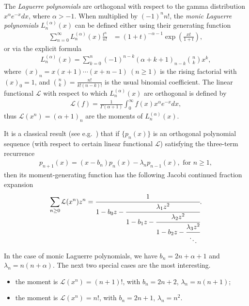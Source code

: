 \documentclass[12pt]{amsart}
\numberwithin{equation}{section}
\theoremstyle{plain}
\theoremstyle{definition}
\begin{document}
The {\it Laguerre polynomials} \cite[Sect.~6.2]{AAR} are orthogonal with respect to the gamma distribution $x^{\alpha}e^{-x}dx$, where $\alpha >-1$. When multiplied by $(-1)^n n!$, the {\it monic Laguerre polynomials} $L_n^{(\alpha)}(x)$ can be defined either using their generating function
\begin{align*} 
\sum_{n=0}^{\infty}L_n^{(\alpha)}(x)\frac{t^n}{n!} &=(1+t)^{-\alpha-1}\exp(\frac{xt}{1+t}),
\end{align*}
or via the explicit formula
\begin{align*} 
L_n^{(\alpha)}(x)=\sum_{k=0}^{n}(-1)^{n-k}(\alpha+k+1)_{n-k}\binom{n}{k}x^k,
\end{align*}
where $(x)_n=x(x+1)\cdots(x+n-1)~(n\ge 1)$ is the rising factorial with $(x)_0=1$, and $\binom{n}{k}=\frac{n!}{k!(n-k)!}$ is the usual binomial coefficient. The linear functional $\mathcal{L}$ with respect to which $L_n^{(\alpha)}(x)$ are orthogonal is defined by
\begin{align*}
\mathcal{L}(f)=\frac{1}{\Gamma(\alpha+1)}\int_{0}^{\infty}f(x)x^{\alpha}e^{-x}dx,
\end{align*}
thus $\mathcal{L}(x^n)=(\alpha+1)_n$ are the moments of $L_n^{(\alpha)}(x)$.

It is a classical result (see e.g.~\cite[Thm.~5.8.2]{AAR}) that if $\{p_n(x)\}$ is an orthogonal polynomial sequence (with respect to certain linear functional $\mathcal{L}$) satisfying the three-term recurrence
\begin{align*}
p_{n+1}(x)=(x-b_n)p_n(x)-\lambda_np_{n-1}(x), \text{ for } n\ge 1,
\end{align*}
then its moment-generating function has the following Jacobi continued fraction expansion
\begin{align}
\label{moment-gf and cf}
\sum_{n\ge 0}\mathcal{L}(x^n)z^n=\cfrac{1}{1-b_0z-\cfrac{\lambda_1z^2}{1-b_1z-\cfrac{\lambda_2z^2}{1-b_2z-\cfrac{\lambda_3z^2}{\ddots}}}}.
\end{align}

In the case of monic Laguerre polynomials, we have $b_n=2n+\alpha+1$ and $\lambda_n=n(n+\alpha)$. The next two special cases are the most interesting.
\begin{itemize}
  \item[$\alpha=1$:] the moment is $\mathcal{L}(x^n)=(n+1)!$, with $b_n=2n+2$, $\lambda_n=n(n+1)$;
  \item[$\alpha=0$:] the moment is $\mathcal{L}(x^n)=n!$, with $b_n=2n+1$, $\lambda_n=n^2$.
\end{itemize}
\end{document}
